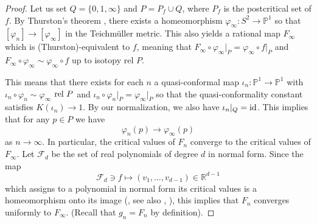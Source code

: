 \documentclass[11pt]{amsart}
\begin{document}
\begin{proof}
Let us set $Q = \{0, 1, \infty\}$ and $P = P_f \cup Q$, where $P_f$ is the postcritical set of $f$.
By Thurston's theorem \cite{DH}, there exists a homeomorphism $\varphi_\infty : S^2 \to \mathbb{P}^1$ so that 
$[\varphi_n] \to [\varphi_\infty]$ in the Teichm\"uller metric. This also yields a rational map $F_\infty$ 
which is (Thurston)-equivalent to $f$, meaning that $F_\infty \circ \varphi_\infty\vert_{P} = \varphi_\infty \circ f\vert_{P}$ and $F_\infty \circ \varphi_\infty \sim \varphi_\infty \circ f$ 
up to isotopy rel $P$.

This means that there exists for each $n$ a quasi-conformal map 
$\iota_n : \mathbb{P}^1 \to \mathbb{P}^1$ with 
$\iota_n \circ \varphi_n \sim \varphi_\infty$ $\textup{rel }P$ and 
$\iota_n \circ \varphi_n\vert_{P} = \varphi_\infty \vert_{P}$
so that the quasi-conformality constant satisfies $K(\iota_n) \to 1$. 
By our normalization, we also have $\iota_n \vert_Q = \textup{id}$.
This implies that for any $p \in P$ we have 
$$\varphi_n(p) \to \varphi_\infty(p)$$
as $n \to \infty$. 
In particular, the critical values of $F_n$ converge to the critical values of $F_\infty$. 
Let $\mathcal{F}_d$ be the set of real polynomials of degree $d$ in normal form.
Since the map 
$$\mathcal{F}_d \ni f \mapsto (v_1, \dots, v_{d-1}) \in \mathbb{R}^{d-1}$$ 
which assigns to a polynomial in normal form its critical values is a homeomorphism onto its image (\cite[Lemmas 3.1, 3.2]{BMS}, see also \cite[Appendix A]{MiTr}, \cite{Ch}), this implies that $F_n$ converges uniformly to $F_\infty$. (Recall that $g_n = F_n$ by definition).
\end{proof}
\end{document}
